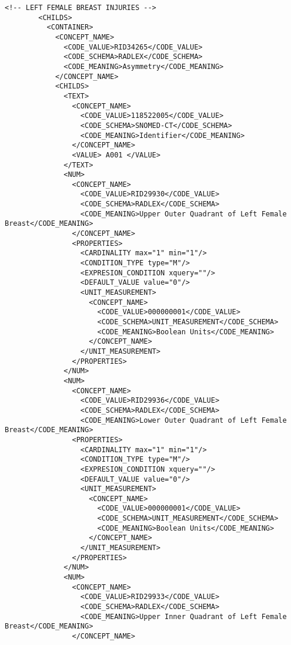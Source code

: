 \begin{lstlisting}[label=dicom-template,caption=Plantilla de un informe estructurado de una exploración de mama]
        <!-- LEFT FEMALE BREAST INJURIES -->
        <CHILDS>
          <CONTAINER>
            <CONCEPT_NAME>
              <CODE_VALUE>RID34265</CODE_VALUE>
              <CODE_SCHEMA>RADLEX</CODE_SCHEMA>
              <CODE_MEANING>Asymmetry</CODE_MEANING>
            </CONCEPT_NAME>
            <CHILDS>
              <TEXT>
                <CONCEPT_NAME>
                  <CODE_VALUE>118522005</CODE_VALUE>
                  <CODE_SCHEMA>SNOMED-CT</CODE_SCHEMA>
                  <CODE_MEANING>Identifier</CODE_MEANING>
                </CONCEPT_NAME>
                <VALUE> A001 </VALUE>
              </TEXT>
              <NUM>
                <CONCEPT_NAME>
                  <CODE_VALUE>RID29930</CODE_VALUE>
                  <CODE_SCHEMA>RADLEX</CODE_SCHEMA>
                  <CODE_MEANING>Upper Outer Quadrant of Left Female Breast</CODE_MEANING>
                </CONCEPT_NAME>
                <PROPERTIES>
                  <CARDINALITY max="1" min="1"/>
                  <CONDITION_TYPE type="M"/>
                  <EXPRESION_CONDITION xquery=""/>
                  <DEFAULT_VALUE value="0"/>
                  <UNIT_MEASUREMENT>
                    <CONCEPT_NAME>
                      <CODE_VALUE>000000001</CODE_VALUE>
                      <CODE_SCHEMA>UNIT_MEASUREMENT</CODE_SCHEMA>
                      <CODE_MEANING>Boolean Units</CODE_MEANING>
                    </CONCEPT_NAME>
                  </UNIT_MEASUREMENT>
                </PROPERTIES>
              </NUM>
              <NUM>
                <CONCEPT_NAME>
                  <CODE_VALUE>RID29936</CODE_VALUE>
                  <CODE_SCHEMA>RADLEX</CODE_SCHEMA>
                  <CODE_MEANING>Lower Outer Quadrant of Left Female Breast</CODE_MEANING>
                <PROPERTIES>
                  <CARDINALITY max="1" min="1"/>
                  <CONDITION_TYPE type="M"/>
                  <EXPRESION_CONDITION xquery=""/>
                  <DEFAULT_VALUE value="0"/>
                  <UNIT_MEASUREMENT>
                    <CONCEPT_NAME>
                      <CODE_VALUE>000000001</CODE_VALUE>
                      <CODE_SCHEMA>UNIT_MEASUREMENT</CODE_SCHEMA>
                      <CODE_MEANING>Boolean Units</CODE_MEANING>
                    </CONCEPT_NAME>
                  </UNIT_MEASUREMENT>
                </PROPERTIES>
              </NUM>
              <NUM>
                <CONCEPT_NAME>
                  <CODE_VALUE>RID29933</CODE_VALUE>
                  <CODE_SCHEMA>RADLEX</CODE_SCHEMA>
                  <CODE_MEANING>Upper Inner Quadrant of Left Female Breast</CODE_MEANING>
                </CONCEPT_NAME>

\end{lstlisting}
